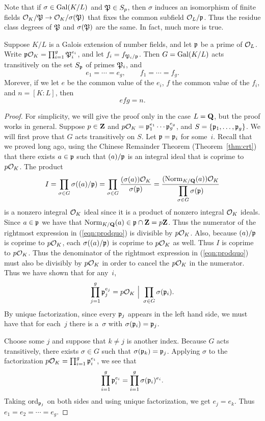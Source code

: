 Note that if $\sigma\in\Gal(K/L)$ and $\P\in S_p$, then $\sigma$
induces an isomorphism of finite fields $\O_K/\P\to \O_K/\sigma(\P)$
that fixes the common subfield $\O_L/\p$.  Thus the residue class
degrees of $\P$ and $\sigma(\P)$ are the same.  In fact, much more is
true.
\begin{theorem}\label{thm:transitive}
Suppose $K/L$ is a Galois extension of number fields,
and let $\p$ be a prime of $\O_L$.  Write 
$\p\O_K=\prod_{i=1}^g \P_i^{e_i}$, and let $f_i = f_{\P_i/\p}$.
Then 
$G=\Gal(K/L)$ acts transitively on the set
$S_\p$ of primes $\P_i$, and  
$$ 
  e_1=\cdots =e_g, \qquad f_1 =\cdots = f_g.
$$
Morever, if we let $e$ be the common value of the $e_i$,
$f$ the common value of the $f_i$, and $n=[K:L]$, then
$$
   efg=n.
$$ 
\end{theorem}
\begin{proof}
For simplicity, we will give the proof only in the case $L=\Q$, but
the proof works in general.  Suppose $p\in\Z$ and
$p\O_K=\p_1^{e_1}\cdots \p_g^{e_g}$, and $S=\{\p_1,\ldots, \p_g\}$.  We
will first prove that $G$ acts transitively on $S$.  Let $\p=\p_i$ for
some~$i$.   Recall that we proved long ago, using the Chinese
Remainder Theorem (Theorem~\ref{thm:crt}) that there exists
$a\in\p$ such that $(a)/\p$ is an integral ideal that is
coprime to $p\O_K$.   The product
\begin{equation}\label{eqn:prodquo}
 I= \prod_{\sigma\in G} \sigma((a)/\p) 
   = \prod_{\sigma\in G} \frac{(\sigma(a))\O_K}{\sigma(\p)}
    = \frac{(\Norm_{K/\Q}(a))\O_K}{\displaystyle \prod_{\sigma\in G} \sigma(\p)}
\end{equation}
is a nonzero integral $\O_K$ ideal since it is a product of nonzero
integral $\O_K$ ideals.   
Since $a\in \p$ we have that
$\Norm_{K/\Q}(a) \in \p\cap\Z=p\Z$.  Thus the numerator of 
the rightmost expression in (\ref{eqn:prodquo}) is
divisible by $p\O_K$.   Also, because $(a)/\p$ is coprime
to $p\O_K$, each $\sigma((a)/\p)$ is coprime to $p\O_K$
as well.   Thus $I$ is coprime to $p\O_K$.   Thus the
denominator of the rightmost expression in (\ref{eqn:prodquo})
must also be divisibly by $p\O_K$ in order to cancel the $p\O_K$
in the numerator.  Thus we have shown that for any~$i$,
$$
  \prod_{j=1}^g \p_j^{e_j} = p\O_K \,\,\Big|\,\, \prod_{\sigma\in G} \sigma(\p_i).
$$
By unique factorization, since every $\p_j$ appears in the left hand
side, we must have that for each~$j$ there is a~$\sigma$ with
$\sigma(\p_i)=\p_j$.

Choose some $j$ and suppose that $k\neq j$ is another index.  Because
$G$ acts transitively, there exists $\sigma\in G$ such that
$\sigma(\p_k)=\p_j$.  Applying $\sigma$ to the factorization $p\O_K =
\prod_{i=1}^g \p_i^{e_i}$, we see that
$$\prod_{i=1}^g \p_i^{e_i} = \prod_{i=1}^g \sigma(\p_i)^{e_i}.$$
Taking 
$\ord_{\p_j}$ on both sides and using unique factorization,
we get $e_j = e_k$.  Thus $e_1=e_2=\cdots = e_g$.


\end{proof}
